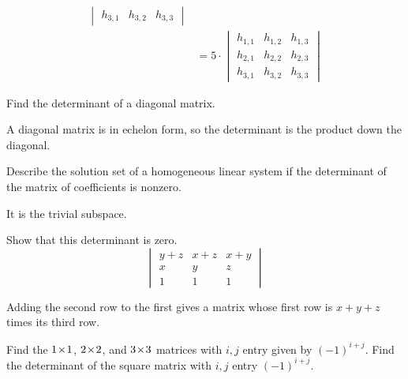\begin{exercises}
\begin{answer}
\begin{exparts}
\begin{align*}
\begin{vmatrix}
            h_{3,1}          &h_{3,2}         &h_{3,3}
          \end{vmatrix}                                     \\
          &=5\cdot
          \begin{vmatrix}
            h_{1,1}          &h_{1,2}         &h_{1,3} \\
            h_{2,1}          &h_{2,2}         &h_{2,3} \\
            h_{3,1}          &h_{3,2}         &h_{3,3}
          \end{vmatrix}
          \end{align*}
      \end{exparts}  
     \end{answer}
  \recommended \item 
    Find the determinant of a diagonal matrix.
    \begin{answer}
       A diagonal matrix is in echelon form, so
       the determinant is the product down the diagonal.
    \end{answer}
  \item 
    Describe the solution set of a homogeneous linear system if the
    determinant of the matrix of coefficients is nonzero.
    \begin{answer}
      It is the trivial subspace.  
    \end{answer}
  \recommended \item 
    Show that this determinant is zero.
    \begin{equation*}
      \begin{vmatrix}
        y+z  &x+z  &x+y  \\
        x    &y    &z    \\
        1    &1    &1
      \end{vmatrix}
    \end{equation*}
    \begin{answer} 
      Adding the second row to the first gives a matrix whose first row
      is $x+y+z$ times its third row.  
    \end{answer}
  \item 
    \begin{exparts}
      \partsitem Find the $1 \! \times \! 1$, $2 \! \times \! 2$, and $3 \! \times \! 3$ matrices
        with $i,j$ entry given by $(-1)^{i+j}$.  
      \partsitem Find the determinant of the square matrix with \( i,j \)
        entry \( (-1)^{i+j} \).
    \end{exparts}
    \begin{answer}

\end{answer}
\end{exercises}
